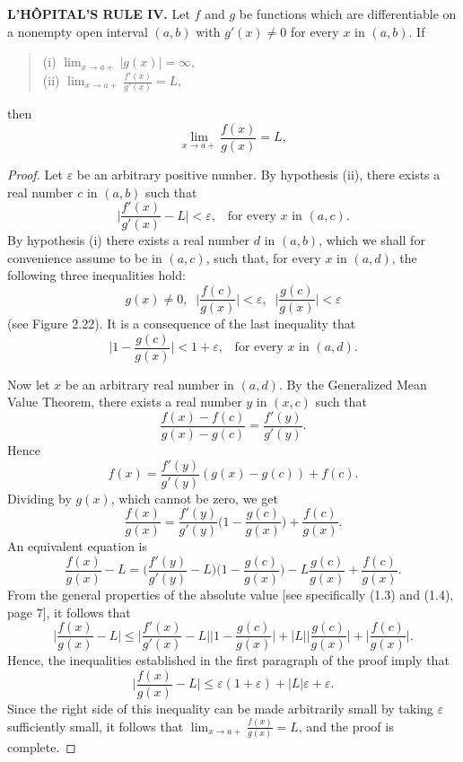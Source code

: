 \begin{theorem} %
\textbf{L'H\^{O}PITAL'S RULE IV.}  Let $f$ and $g$ be functions which are differentiable on a nonempty open interval $(a, b)$ with $g'(x) \neq 0$ for every $x$ in $(a, b)$. If


\begin{quote}
\begin{description}
\item[(i) $\lim_{x \rightarrow a+} |g(x)| = \infty$,]
\item[(ii) $\lim_{x \rightarrow a+} \frac{f'(x)}{g'(x)} = L$,]

\end{description}
\end{quote}

\noindent then
$$
\lim_{x \rightarrow a+} \frac{f(x)}{g(x)} = L,
$$
\end{theorem}

\begin{proof}
Let $\varepsilon$ be an arbitrary positive number. By hypothesis (ii), there exists a real number $c$ in $(a, b)$ such that
$$
\Big| \frac{f'(x)}{g'(x)} - L \Big| < \varepsilon, \;\;\; \mbox{for every $x$ in $(a, c)$}. 
$$
By hypothesis (i) there exists a real number $d$ in $(a, b)$, which we shall for convenience assume to be in $(a, c)$, such that, for every $x$ in $(a, d)$, the following three inequalities hold:
$$
g(x) \neq 0, \;\; \Big| \frac{f(c)}{g(x)} \Big| < \varepsilon, \;\; \Big|\frac{g(c)}{g(x)} \Big| < \varepsilon
$$
(see Figure \f{2.22}).
It is a consequence of the last inequality that
$$
\Big| 1 - \frac{g(c)}{g(x)} \Big| < 1 + \varepsilon, \;\;\; \mbox{for every $x$ in $(a, d)$}.
$$

Now let $x$ be an arbitrary real number in $(a, d)$. By the Generalized Mean Value Theorem, there exists a real number $y$ in $(x, c)$ such that
$$
\frac{f(x)-f(c)}{g(x)- g(c)} = \frac{f'(y)}{g'(y)}.
$$
Hence
$$
 f(x) = \frac{f'(y)}{g'(y)}(g(x) - g(c)) + f(c).
$$
\noindent Dividing by $g(x)$, which cannot be zero, we get 
$$
\frac{f(x)}{g(x)} = \frac{f'(y)}{g'(y)} \biggl(1 - \frac{g(c)}{g(x)}\biggr) + \frac{f(c)}{g(x) }.
$$
An equivalent equation is
$$
\frac{f(x)}{g(x)} - L = \biggl( \frac{f'(y)}{g'(y)} - L\biggr) \biggl(1 - \frac{g(c)}{g(x)}
\biggr) - L \frac{g(c)}{g(x)} + \frac{f(c)}{g(x)}.
$$
\noindent From the general properties of the absolute value [see specifically (1.3) and (1.4), page 7], it follows that
$$
\Big| \frac{f(x)}{g(x)} - L \Big| \leq \Big| \frac{f'(x)}{g'(x)} - L \Big|  \Big| 1 - \frac{g(c)}{g(x)} \Big| + | L | \Big| \frac{g(c)}{g(x)} \Big| + \Big| \frac{f(c)}{g(x)} \Big|.
$$
Hence, the inequalities established in the first paragraph of the proof imply that
$$
\Big| \frac{f(x)}{g(x)} - L \Big| \leq \varepsilon (1 + \varepsilon) + |L| \varepsilon + \varepsilon.
$$
Since the right side of this inequality can be made arbitrarily small by taking $\varepsilon$ sufficiently small, it follows that $\lim_{x \rightarrow a+} \frac{f(x)}{g(x)} = L$, and the proof is complete. 
\end{proof}

